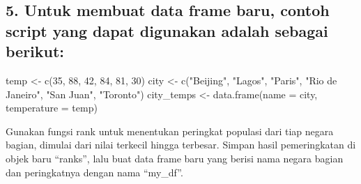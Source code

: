 \documentclass[
]{article}
\newenvironment{Shaded}{\begin{snugshade}}{\end{snugshade}}
\newcommand{\AttributeTok}[1]{\textcolor[rgb]{0.77,0.63,0.00}{#1}}
\newcommand{\DecValTok}[1]{\textcolor[rgb]{0.00,0.00,0.81}{#1}}
\newcommand{\FunctionTok}[1]{\textcolor[rgb]{0.00,0.00,0.00}{#1}}
\newcommand{\NormalTok}[1]{#1}
\newcommand{\OtherTok}[1]{\textcolor[rgb]{0.56,0.35,0.01}{#1}}
\newcommand{\SpecialCharTok}[1]{\textcolor[rgb]{0.00,0.00,0.00}{#1}}
\newcommand{\StringTok}[1]{\textcolor[rgb]{0.31,0.60,0.02}{#1}}
\begin{document}
\hypertarget{untuk-membuat-data-frame-baru-contoh-script-yang-dapat-digunakan-adalah-sebagai-berikut}{%
\subsection{5. Untuk membuat data frame baru, contoh script yang dapat
digunakan adalah sebagai
berikut:}\label{untuk-membuat-data-frame-baru-contoh-script-yang-dapat-digunakan-adalah-sebagai-berikut}}

\begin{Shaded}
\begin{Highlighting}[]
\NormalTok{temp }\OtherTok{\textless{}{-}} \FunctionTok{c}\NormalTok{(}\DecValTok{35}\NormalTok{, }\DecValTok{88}\NormalTok{, }\DecValTok{42}\NormalTok{, }\DecValTok{84}\NormalTok{, }\DecValTok{81}\NormalTok{, }\DecValTok{30}\NormalTok{)}
\NormalTok{city }\OtherTok{\textless{}{-}} \FunctionTok{c}\NormalTok{(}\StringTok{"Beijing"}\NormalTok{, }\StringTok{"Lagos"}\NormalTok{, }\StringTok{"Paris"}\NormalTok{, }\StringTok{"Rio de Janeiro"}\NormalTok{,}
\StringTok{"San Juan"}\NormalTok{, }\StringTok{"Toronto"}\NormalTok{)}
\NormalTok{city\_temps }\OtherTok{\textless{}{-}} \FunctionTok{data.frame}\NormalTok{(}\AttributeTok{name =}\NormalTok{ city, }\AttributeTok{temperature =}\NormalTok{ temp)}
\end{Highlighting}
\end{Shaded}

Gunakan fungsi rank untuk menentukan peringkat populasi dari tiap negara
bagian, dimulai dari nilai terkecil hingga terbesar. Simpan hasil
pemeringkatan di objek baru ``ranks'', lalu buat data frame baru yang
berisi nama negara bagian dan peringkatnya dengan nama ``my\_df''.

\begin{Shaded}
\end{Shaded}
\end{document}
